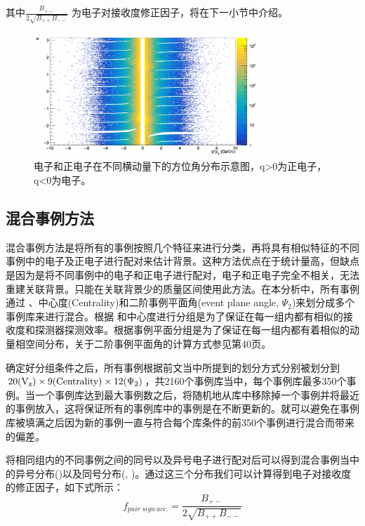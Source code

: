 其中$\frac{B_{+-}}{2\sqrt{B_{++}B_{--}}}$ 为电子对接收度修正因子，将在下一小节中介绍。

\begin{figure}[htb]
  \begin{center}
  \includegraphics[width=0.75\textwidth,clip]{figures/Chapter4/Phi_vs_Q.png}
  \end{center}
  \caption[电子和正电子在不同横动量下的方位角分布示意图]{电子和正电子在不同横动量下的方位角分布示意图，q>0为正电子，q<0为电子。}
  \label{fig:Phi_vs_Q}
\end{figure}

\subsection{混合事例方法}
\label{chap:mixedEvent}
混合事例方法是将所有的事例按照几个特征来进行分类，再将具有相似特征的不同事例中的电子及正电子进行配对来估计背景。这种方法优点在于统计量高，但缺点是因为是将不同事例中的电子和正电子进行配对，电子和正电子完全不相关，无法重建关联背景。只能在关联背景少的质量区间使用此方法。在本分析中，所有事例通过 \Vz 、中心度(Centrality)和二阶事例平面角(event plane angle, $\Psi_2$)来划分成多个事例库来进行混合。根据 \Vz 和中心度进行分组是为了保证在每一组内都有相似的接收度和探测器探测效率。根据事例平面分组是为了保证在每一组内都有着相似的动量相空间分布，关于二阶事例平面角的计算方式参见\cite{Die:BESI_note}第40页。

确定好分组条件之后，所有事例根据前文当中所提到的划分方式分别被划分到$\rm{20(V_z) \times 9(Centrality) \times 12 (\Psi_2)}$，共2160个事例库当中，每个事例库最多350个事例。当一个事例库达到最大事例数之后，将随机地从库中移除掉一个事例并将最近的事例放入，这将保证所有的事例库中的事例是在不断更新的。就可以避免在事例库被填满之后因为新的事例一直与符合每个库条件的前350个事例进行混合而带来的偏差。

将相同组内的不同事例之间的同号以及异号电子进行配对后可以得到混合事例当中的异号分布(\Bpm)以及同号分布(\Bpp , \Bmm )。通过这三个分布我们可以计算得到电子对接收度的修正因子，如下式所示：
\begin{equation}
  f_{pair~sign~acc.} = \frac{B_{+-}}{2\sqrt{B_{++}B_{--}}}
\end{equation}

